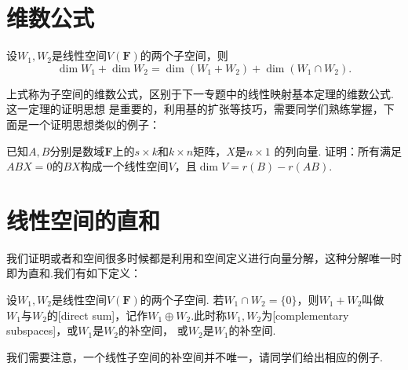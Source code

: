 \section{维数公式}
\begin{theorem}
    设$W_1,W_2$是线性空间$V(\mathbf{F})$的两个子空间，则
    \[\dim W_1+\dim W_2=\dim(W_1+W_2)+\dim(W_1\cap W_2).\]
\end{theorem}
上式称为子空间的维数公式，区别于下一专题中的线性映射基本定理的维数公式.这一定理的证明思想
是重要的，利用基的扩张等技巧，需要同学们熟练掌握，下面是一个证明思想类似的例子：
\begin{example}
    已知$A,B$分别是数域$\mathbf{F}$上的$s \times k$和$k \times n$矩阵，$X$是$n \times 1$
    的列向量. 证明：所有满足$ABX=0$的$BX$构成一个线性空间$V$，且$\dim V = r(B) - r(AB)$.
\end{example}

\section{线性空间的直和}
我们证明或者和空间很多时候都是利用和空间定义进行向量分解，这种分解唯一时即为直和.我们有如下定义：
\begin{definition}
    设$W_1,W_2$是线性空间$V(\mathbf{F})$的两个子空间. 若$W_1 \cap W_2=\{0\}$，则$W_1+W_2$叫做
    $W_1$与$W_2$的[direct sum]，记作$W_1\oplus W_2$.此时称$W_1,W_2$为[complementary subspaces]，或$W_1$是$W_2$的补空间，
    或$W_2$是$W_1$的补空间.
\end{definition}
我们需要注意，一个线性子空间的补空间并不唯一，请同学们给出相应的例子.


